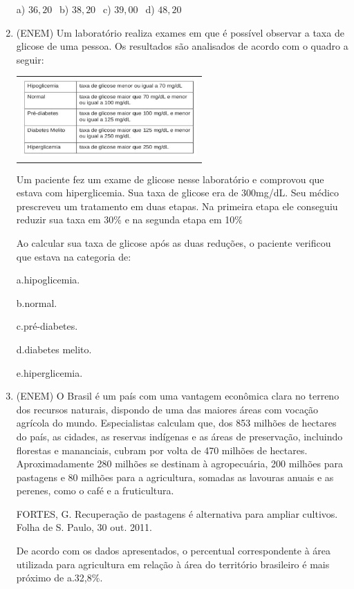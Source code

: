 \begin{multicols*}{2}
\begin{enumerate}
	a) $36,20 \ \ $ b) $38,20 \ \ $ c) $39,00 \ \ $ d) $48,20 $

	\item (ENEM) Um laboratório realiza exames em que é possível observar a taxa de glicose de uma pessoa. Os
resultados são analisados de acordo com o quadro a seguir:

		\begin{tabular}{@{}c@{}}
		  \includegraphics[height=30mm]{assets/glicemia.png}
		\end{tabular}   	

Um paciente fez um exame de glicose nesse laboratório e comprovou que estava com hiperglicemia. Sua taxa de
glicose era de 300mg/dL. Seu médico prescreveu um tratamento em duas etapas. Na primeira etapa ele
conseguiu reduzir sua taxa em 30\% e na segunda etapa em 10\%

Ao calcular sua taxa de glicose após as duas reduções, o paciente verificou que estava na categoria de:

a.hipoglicemia.

b.normal.

c.pré-diabetes.

d.diabetes melito.

e.hiperglicemia.


	\item (ENEM) O Brasil é um país com uma vantagem econômica clara no terreno dos recursos naturais, dispondo de uma das maiores áreas com vocação agrícola do mundo. Especialistas calculam que, dos 853 milhões de hectares do país, as cidades, as reservas indígenas e as áreas de preservação, incluindo florestas e mananciais, cubram por volta de 470 milhões de hectares. Aproximadamente 280 milhões se destinam à agropecuária, 200 milhões para pastagens e 80 milhões para a agricultura, somadas as lavouras anuais e as perenes, como o café e a fruticultura.

FORTES, G. Recuperação de pastagens é alternativa para ampliar cultivos. Folha de S. Paulo, 30 out. 2011.

De acordo com os dados apresentados, o percentual correspondente à área utilizada para agricultura em relação à área do território brasileiro é mais próximo de a.32,8\%.


\end{enumerate}
\end{multicols*}
